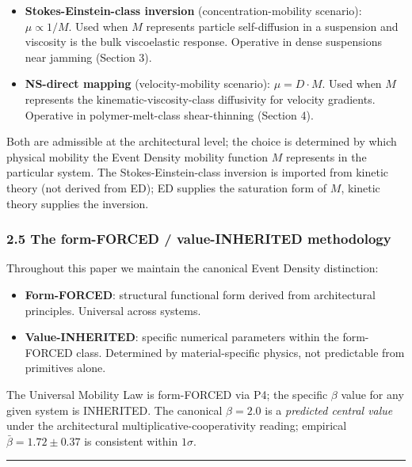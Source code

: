 \documentclass[
  11pt,a4paper]{article}
\providecommand{\tightlist}{%
  \setlength{\itemsep}{0pt}\setlength{\parskip}{0pt}}
\begin{document}
\begin{itemize}
\item
  \textbf{Stokes-Einstein-class inversion} (concentration-mobility
  scenario): \(\mu \propto 1/M\). Used when \(M\) represents particle
  self-diffusion in a suspension and viscosity is the bulk viscoelastic
  response. Operative in dense suspensions near jamming (Section 3).
\item
  \textbf{NS-direct mapping} (velocity-mobility scenario):
  \(\mu = D \cdot M\). Used when \(M\) represents the
  kinematic-viscosity-class diffusivity for velocity gradients.
  Operative in polymer-melt-class shear-thinning (Section 4).
\end{itemize}

Both are admissible at the architectural level; the choice is determined
by which physical mobility the Event Density mobility function \(M\)
represents in the particular system. The Stokes-Einstein-class inversion
is imported from kinetic theory (not derived from ED); ED supplies the
saturation form of \(M\), kinetic theory supplies the inversion.

\subsubsection{2.5 The form-FORCED / value-INHERITED
methodology}\label{the-form-forced-value-inherited-methodology}

Throughout this paper we maintain the canonical Event Density
distinction:

\begin{itemize}
\tightlist
\item
  \textbf{Form-FORCED}: structural functional form derived from
  architectural principles. Universal across systems.
\item
  \textbf{Value-INHERITED}: specific numerical parameters within the
  form-FORCED class. Determined by material-specific physics, not
  predictable from primitives alone.
\end{itemize}

The Universal Mobility Law is form-FORCED via P4; the specific \(\beta\)
value for any given system is INHERITED. The canonical \(\beta = 2.0\)
is a \emph{predicted central value} under the architectural
multiplicative-cooperativity reading; empirical
\(\bar\beta = 1.72 \pm 0.37\) is consistent within \(1\sigma\).

\begin{center}\rule{0.5\linewidth}{0.5pt}\end{center}
\end{document}
